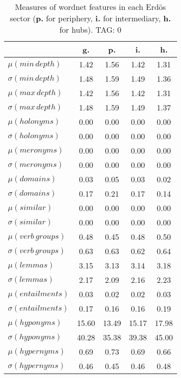 \begin{table}[h!]
\begin{center}
\begin{tabular}{| l | c | c | c | c |}\hline
 & g. & p. & i. & h. \\\hline
$\mu(min\,depth)$ & 1.42  & 1.56  & 1.42  & 1.31 \\\hline
$\sigma(min\,depth)$ & 1.48  & 1.59  & 1.49  & 1.36 \\\hline
$\mu(max\,depth)$ & 1.42  & 1.56  & 1.42  & 1.31 \\\hline
$\sigma(max\,depth)$ & 1.48  & 1.59  & 1.49  & 1.37 \\\hline
$\mu(holonyms)$ & 0.00  & 0.00  & 0.00  & 0.00 \\\hline
$\sigma(holonyms)$ & 0.00  & 0.00  & 0.00  & 0.00 \\\hline
$\mu(meronyms)$ & 0.00  & 0.00  & 0.00  & 0.00 \\\hline
$\sigma(meronyms)$ & 0.00  & 0.00  & 0.00  & 0.00 \\\hline
$\mu(domains)$ & 0.03  & 0.05  & 0.03  & 0.02 \\\hline
$\sigma(domains)$ & 0.17  & 0.21  & 0.17  & 0.14 \\\hline
$\mu(similar)$ & 0.00  & 0.00  & 0.00  & 0.00 \\\hline
$\sigma(similar)$ & 0.00  & 0.00  & 0.00  & 0.00 \\\hline
$\mu(verb\,groups)$ & 0.48  & 0.45  & 0.48  & 0.50 \\\hline
$\sigma(verb\,groups)$ & 0.63  & 0.63  & 0.62  & 0.64 \\\hline
$\mu(lemmas)$ & 3.15  & 3.13  & 3.14  & 3.18 \\\hline
$\sigma(lemmas)$ & 2.17  & 2.09  & 2.16  & 2.23 \\\hline
$\mu(entailments)$ & 0.03  & 0.02  & 0.02  & 0.03 \\\hline
$\sigma(entailments)$ & 0.17  & 0.16  & 0.16  & 0.19 \\\hline
$\mu(hyponyms)$ & 15.60  & 13.49  & 15.17  & 17.98 \\\hline
$\sigma(hyponyms)$ & 40.28  & 35.38  & 39.38  & 45.00 \\\hline
$\mu(hypernyms)$ & 0.69  & 0.73  & 0.69  & 0.66 \\\hline
$\sigma(hypernyms)$ & 0.46  & 0.45  & 0.46  & 0.48 \\\hline
\end{tabular}
\caption{Measures of wordnet features in each Erd\"os sector ({{\bf p.}} for periphery, {{\bf i.}} for intermediary, {{\bf h.}} for hubs). TAG: 0}
\end{center}
\end{table}
